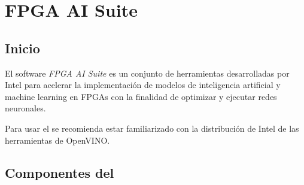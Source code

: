\chapter{FPGA AI Suite}

\section{Inicio}

    El software \textit{FPGA AI Suite} es un conjunto de herramientas desarrolladas por Intel para acelerar la implementaci\'on de modelos de inteligencia artificial y machine learning en FPGAs con la finalidad de optimizar y ejecutar redes neuronales.

    Para usar el \ais se recomienda estar familiarizado con la distribuci\'on de Intel de las herramientas de OpenVINO.

\section{Componentes del \ais}
    
